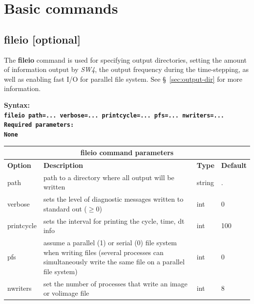 \documentclass[11pt]{report}
\begin{document}
\section{Basic commands}

\subsection{fileio [optional]}
The {\bf fileio} command is used for specifying output directories, setting the amount of
information output by \emph{SW4}, the output frequency during the time-stepping, as well
as enabling fast I/O for parallel file system. See \S~\ref{sec:output-dir} for more information.
\begin{flushleft}\bf
Syntax:\\ \tt fileio path=... verbose=... printcycle=... pfs=... nwriters=... \\ 
\bf Required parameters:\\ 
\rm None
\end{flushleft}
\begin{center}
\begin{tabular}{|l|p{8cm}|l|l|} \hline
\multicolumn{4}{|c|}{\bf fileio command parameters}\\ \hline
\bf{Option} & \bf{Description} & \bf{Type} & \bf{Default} \\ \hline \hline
path        & path to a directory where all output will be written & string & . \\ \hline
verbose	    & sets the level of diagnostic messages written to standard out ($\geq 0$) & int & 0  \\ \hline
printcycle  & sets the interval for printing the cycle, time, dt info & int & 100 \\ \hline
pfs         & assume a parallel (1) or serial (0) file system when writing files (several
processes can simultaneously write the same file on a parallel file system) & int & 0 \\ \hline
nwriters    & set the number of processes that write an image or volimage file & int & 8 \\ \hline
\end{tabular}
\end{center}
\end{document}
